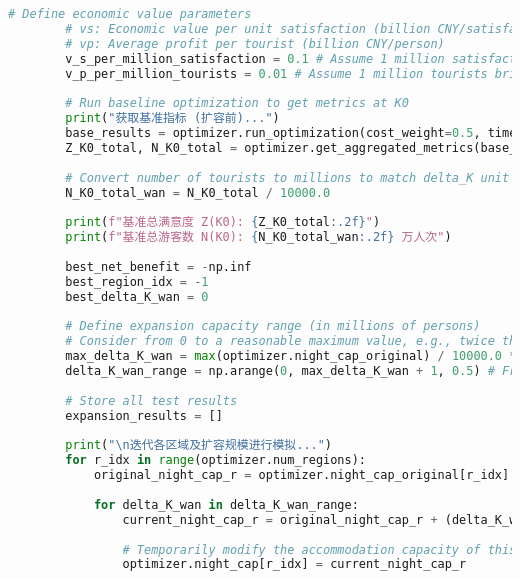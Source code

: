 \begin{lstlisting}[language=Python]
        # Define economic value parameters
        # vs: Economic value per unit satisfaction (billion CNY/satisfaction)
        # vp: Average profit per tourist (billion CNY/person)
        v_s_per_million_satisfaction = 0.1 # Assume 1 million satisfaction brings 0.1 billion CNY
        v_p_per_million_tourists = 0.01 # Assume 1 million tourists brings 0.01 billion CNY (10 CNY/person, 1 million * 10 = 10 million CNY = 0.01 billion CNY)
    
        # Run baseline optimization to get metrics at K0
        print("获取基准指标 (扩容前)...")
        base_results = optimizer.run_optimization(cost_weight=0.5, time_weight=0.5, tourists_1day=30000, tourists_2day=30000, tourists_3day=20000)
        Z_K0_total, N_K0_total = optimizer.get_aggregated_metrics(base_results)
        
        # Convert number of tourists to millions to match delta_K unit
        N_K0_total_wan = N_K0_total / 10000.0
    
        print(f"基准总满意度 Z(K0): {Z_K0_total:.2f}")
        print(f"基准总游客数 N(K0): {N_K0_total_wan:.2f} 万人次")
    
        best_net_benefit = -np.inf
        best_region_idx = -1
        best_delta_K_wan = 0
        
        # Define expansion capacity range (in millions of persons)
        # Consider from 0 to a reasonable maximum value, e.g., twice the original maximum capacity
        max_delta_K_wan = max(optimizer.night_cap_original) / 10000.0 * 2 # Twice the original max capacity, in millions of persons
        delta_K_wan_range = np.arange(0, max_delta_K_wan + 1, 0.5) # From 0 to max_delta_K_wan, step 0.5 million persons
        
        # Store all test results
        expansion_results = []
    
        print("\n迭代各区域及扩容规模进行模拟...")
        for r_idx in range(optimizer.num_regions):
            original_night_cap_r = optimizer.night_cap_original[r_idx] # Get the original capacity of this region
    
            for delta_K_wan in delta_K_wan_range:
                current_night_cap_r = original_night_cap_r + (delta_K_wan * 10000) # Convert millions of persons back to persons
                
                # Temporarily modify the accommodation capacity of this region
                optimizer.night_cap[r_idx] = current_night_cap_r
                

\end{lstlisting}
